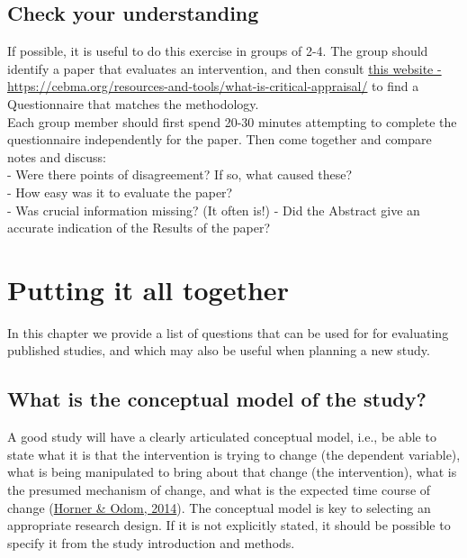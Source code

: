 \documentclass{krantz}
\begin{document}
\hypertarget{check-your-understanding-22}{%
\section{Check your understanding}\label{check-your-understanding-22}}

If possible, it is useful to do this exercise in groups of 2-4. The group should identify a paper that evaluates an intervention, and then consult \href{https://cebma.org/resources-and-tools/what-is-critical-appraisal/}{this website - https://cebma.org/resources-and-tools/what-is-critical-appraisal/} to find a Questionnaire that matches the methodology.\\
Each group member should first spend 20-30 minutes attempting to complete the questionnaire independently for the paper. Then come together and compare notes and discuss:\\
- Were there points of disagreement? If so, what caused these?\\
- How easy was it to evaluate the paper?\\
- Was crucial information missing? (It often is!) - Did the Abstract give an accurate indication of the Results of the paper?

\hypertarget{final}{%
\chapter{Putting it all together}\label{final}}

In this chapter we provide a list of questions that can be used for for evaluating published studies, and which may also be useful when planning a new study.

\hypertarget{what-is-the-conceptual-model-of-the-study}{%
\section{What is the conceptual model of the study?}\label{what-is-the-conceptual-model-of-the-study}}

A good study will have a clearly articulated conceptual model, i.e., be able to state what it is that the intervention is trying to change (the dependent variable), what is being manipulated to bring about that change (the intervention), what is the presumed mechanism of change, and what is the expected time course of change (\protect\hyperlink{ref-horner2014}{Horner \& Odom, 2014}). The conceptual model is key to selecting an appropriate research design. If it is not explicitly stated, it should be possible to specify it from the study introduction and methods. 
\end{document}
